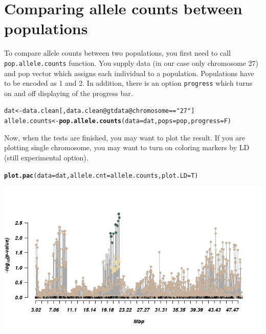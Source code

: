\documentclass[12pt,a4paper,oneside]{article}\usepackage[]{graphicx}\usepackage[]{color}
\makeatletter
\newcommand{\hlstr}[1]{\textcolor[rgb]{0.192,0.494,0.8}{#1}}%
\newcommand{\hlopt}[1]{\textcolor[rgb]{0,0,0}{#1}}%
\newcommand{\hlstd}[1]{\textcolor[rgb]{0.345,0.345,0.345}{#1}}%
\newcommand{\hlkwb}[1]{\textcolor[rgb]{0.69,0.353,0.396}{#1}}%
\newcommand{\hlkwc}[1]{\textcolor[rgb]{0.333,0.667,0.333}{#1}}%
\newcommand{\hlkwd}[1]{\textcolor[rgb]{0.737,0.353,0.396}{\textbf{#1}}}%
\newenvironment{kframe}{%
 \def\at@end@of@kframe{}%
 \ifinner\ifhmode%
  \def\at@end@of@kframe{\end{minipage}}%
  \begin{minipage}{\columnwidth}%
 \fi\fi%
 \def\FrameCommand##1{\hskip\@totalleftmargin \hskip-\fboxsep
 \colorbox{shadecolor}{##1}\hskip-\fboxsep
     \hskip-\linewidth \hskip-\@totalleftmargin \hskip\columnwidth}%
 \MakeFramed {\advance\hsize-\width
   \@totalleftmargin\z@ \linewidth\hsize
   \@setminipage}}%
 {\par\unskip\endMakeFramed%
 \at@end@of@kframe}
\newenvironment{knitrout}{}{} %
\makeatother
\begin{document}
\section*{Comparing allele counts between populations}
To compare allele counts between two populations, you first need to call {\tt pop.allele.counts} function. You supply data (in our case only chromosome 27) and pop vector which assigns each individual to a population. Populations have to be encoded as 1 and 2. In addition, there is an option {\tt progress} which turns on and off displaying of the progress bar.
\begin{knitrout}\footnotesize
{}\color{fgcolor}\begin{kframe}
\begin{alltt}
\hlstd{dat} \hlkwb{<-} \hlstd{data.clean[, data.clean}\hlopt{@}\hlkwc{gtdata}\hlopt{@}\hlkwc{chromosome} \hlopt{==} \hlstr{"27"}\hlstd{]}
\hlstd{allele.counts} \hlkwb{<-} \hlkwd{pop.allele.counts}\hlstd{(}\hlkwc{data} \hlstd{= dat,} \hlkwc{pops} \hlstd{= pop,} \hlkwc{progress} \hlstd{= F)}
\end{alltt}
\end{kframe}
\end{knitrout}
Now, when the tests are finished, you may want to plot the result. If you are plotting single chromosome, you may want to turn on coloring markers by LD (still experimental option).
\begin{knitrout}\footnotesize
{}\color{fgcolor}\begin{kframe}
\begin{alltt}
\hlkwd{plot.pac}\hlstd{(}\hlkwc{data} \hlstd{= dat,} \hlkwc{allele.cnt} \hlstd{= allele.counts,} \hlkwc{plot.LD} \hlstd{= T)}
\end{alltt}


{\ttfamily\noindent\itshape\color{messagecolor}{\#\# Loading required package: wesanderson}}\end{kframe}

{\centering \includegraphics[width=1.0\textwidth]{images/plot_pac1} 

}



\end{knitrout}
\end{document}
